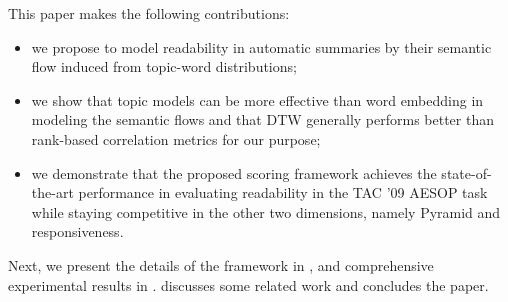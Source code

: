 This paper makes the following contributions:
\begin{itemize}

\item we propose to model readability in automatic summaries
by their semantic flow induced from topic-word distributions;

\item we show that topic models can be more effective than word embedding
in modeling the semantic flows and that DTW generally performs better than
rank-based correlation metrics for our purpose; 

\item we demonstrate that the proposed scoring framework achieves the
state-of-the-art performance in evaluating readability in the TAC '09 AESOP
task while staying competitive in the other two dimensions, namely Pyramid
and responsiveness. 

\end{itemize}

Next, we present the details of the framework in , 
and comprehensive experimental results in .
 discusses some related work and 
concludes the paper. 

